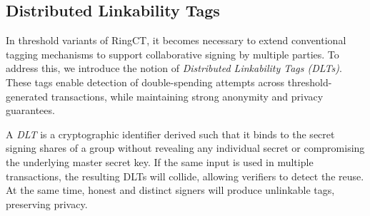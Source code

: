 \subsection{Distributed Linkability Tags}\label{DLT}
In threshold variants of RingCT, it becomes necessary to extend conventional tagging mechanisms to support collaborative signing by multiple parties. To address this, we introduce the notion of \emph{Distributed Linkability Tags (DLTs)}. These tags enable detection of double-spending attempts across threshold-generated transactions, while maintaining strong anonymity and privacy guarantees.

A \emph{DLT} is a cryptographic identifier derived such that it binds to the secret signing shares of a group without revealing any individual secret or compromising the underlying master secret key. If the same input is used in multiple transactions, the resulting DLTs will collide, allowing verifiers to detect the reuse. At the same time, honest and distinct signers will produce unlinkable tags, preserving privacy.

